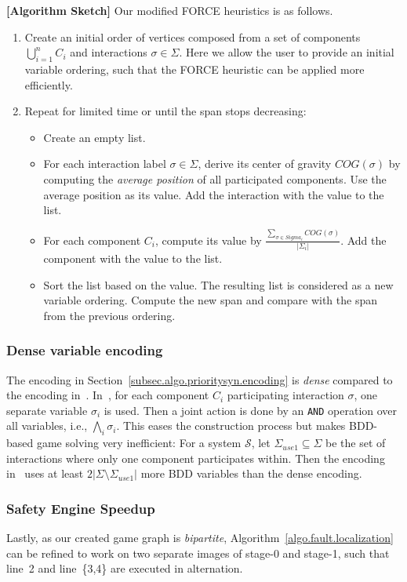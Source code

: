\documentclass[10pt, a4paper, onecolumn, conference, compsocconf]{IEEEtran}
\begin{document}
\noindent\textbf{[Algorithm Sketch]} Our modified FORCE heuristics is as follows.
\begin{enumerate}
    \item Create an initial order of vertices composed from a set of components $\bigcup_{i=1}^{n} C_i$ and interactions $\sigma\in \Sigma$. Here we allow the user to provide an initial variable ordering, such that the FORCE heuristic can be applied more efficiently.
    \item Repeat for limited time or until the span stops decreasing:
        \begin{itemize}
            \item Create an empty list.
            \item For each interaction label $\sigma\in \Sigma$, derive its center of gravity $COG(\sigma)$ by computing the \emph{average position} of all participated components. Use the average position as its value. Add the interaction with the value to the list.
            \item For each component $C_i$, compute its value by $\frac{\sum_{\sigma \in Sigma_i}COG(\sigma)}{|\Sigma_i|}$. Add the component with the value to the list.
            \item Sort the list based on the value. The resulting list is considered as a new variable ordering. Compute the new span and compare with the span from the previous ordering.
        \end{itemize}
\end{enumerate}


\subsubsection{Dense variable encoding} The encoding in Section~\ref{subsec.algo.prioritysyn.encoding} is \emph{dense} compared to the encoding in~\cite{cheng:vissbip:2011}. In~\cite{cheng:vissbip:2011}, for each component $C_i$ participating interaction $\sigma$, one separate variable $\sigma_i$ is used. Then a joint action is done by an \texttt{AND} operation over all variables, i.e., $\bigwedge_i \sigma_i$. This eases the construction process but makes BDD-based game solving very inefficient: For a system $\mathcal{S}$, let $\Sigma_{use1}\subseteq \Sigma$ be the set of interactions where only one component participates within. Then the encoding in~\cite{cheng:vissbip:2011} uses at least $2|\Sigma\setminus \Sigma_{use1}|$ more BDD variables than the dense encoding.

\subsubsection{Safety Engine Speedup} Lastly, as our created game graph is \emph{bipartite}, Algorithm~\ref{algo.fault.localization} can be refined to work on two separate images of stage-0 and stage-1, such that line~2 and line~\{3,4\} are executed in alternation.
\end{document}
